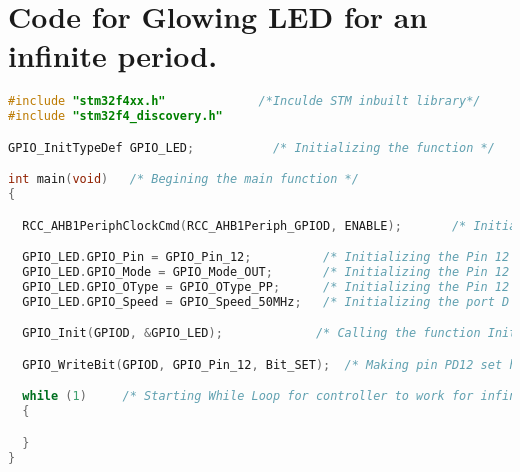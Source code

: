 \section{Code for Glowing LED for an infinite period.}
\begin{lstlisting}[language=C++]
#include "stm32f4xx.h"             /*Inculde STM inbuilt library*/
#include "stm32f4_discovery.h"

GPIO_InitTypeDef GPIO_LED;           /* Initializing the function */

int main(void)   /* Begining the main function */
{

  RCC_AHB1PeriphClockCmd(RCC_AHB1Periph_GPIOD, ENABLE);       /* Initializing and starting the clock of Port D */

  GPIO_LED.GPIO_Pin = GPIO_Pin_12;          /* Initializing the Pin 12 */
  GPIO_LED.GPIO_Mode = GPIO_Mode_OUT;       /* Initializing the Pin 12 in output mode */
  GPIO_LED.GPIO_OType = GPIO_OType_PP;      /* Initializing the Pin 12 with Push Pull mode */
  GPIO_LED.GPIO_Speed = GPIO_Speed_50MHz;   /* Initializing the port D with the clock speed */

  GPIO_Init(GPIOD, &GPIO_LED);             /* Calling the function Init by passing two values */

  GPIO_WriteBit(GPIOD, GPIO_Pin_12, Bit_SET);  /* Making pin PD12 set high by passing Bit_SET value  */

  while (1)     /* Starting While Loop for controller to work for infinite Period */
  {

  }
}

\end{lstlisting}


